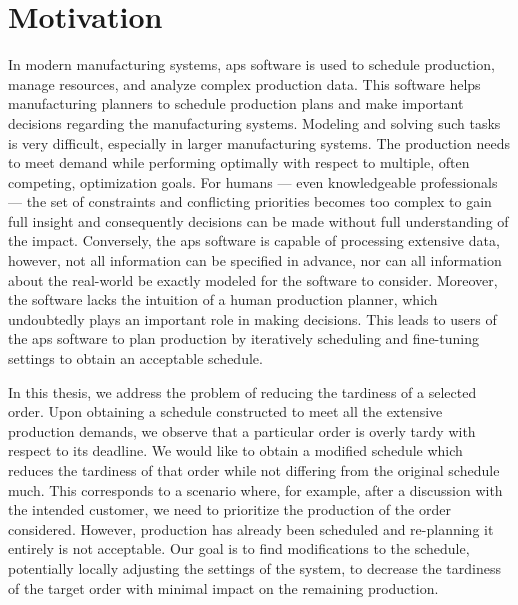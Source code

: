  \label{chap:introduction}

\section*{Motivation} \label{sec:introduction/motivation}

In modern manufacturing systems, \ac{aps} software is used to schedule production,
manage resources, and analyze complex production data.
This software helps manufacturing planners to schedule production plans
and make important decisions regarding the manufacturing systems.
Modeling and solving such tasks is very difficult, especially in larger manufacturing systems.
The production needs to meet demand while performing optimally with respect to multiple,
often competing, optimization goals.
For humans --- even knowledgeable professionals ---
the set of constraints and conflicting priorities becomes too complex to gain full insight
and consequently decisions can be made without full understanding of the impact.
Conversely, the \ac{aps} software is capable of processing extensive data,
however, not all information can be specified in advance,
nor can all information about the real-world be exactly modeled for the software to consider.
Moreover, the software lacks the intuition of a human production planner,
which undoubtedly plays an important role in making decisions.
This leads to users of the \ac{aps} software to plan production by iteratively
scheduling and fine-tuning settings to obtain an acceptable schedule.

In this thesis, we address the problem of reducing the tardiness of a selected order.
Upon obtaining a schedule constructed to meet all the extensive production demands,
we observe that a particular order is overly tardy with respect to its deadline.
We would like to obtain a modified schedule which reduces the tardiness of that order
while not differing from the original schedule much.
This corresponds to a scenario where, for example, after a discussion with the intended customer,
we need to prioritize the production of the order considered.
However, production has already been scheduled and re-planning it entirely is not acceptable.
Our goal is to find modifications to the schedule,
potentially locally adjusting the settings of the system,
to decrease the tardiness of the target order with minimal impact on the remaining production.

